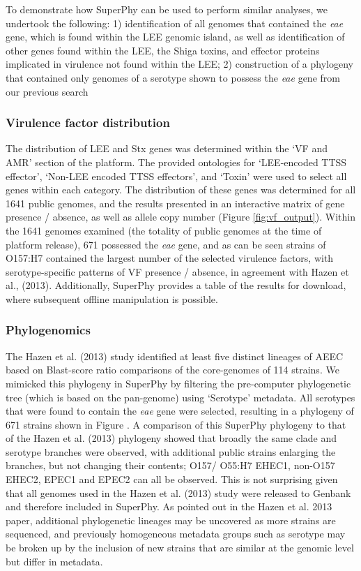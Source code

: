 \documentclass[doublespacing, linenumbers]{bmcart}
\begin{document}
To demonstrate how SuperPhy can be used to perform similar analyses, we undertook the following: 1) identification of all genomes that contained the \textit{eae} gene, which is found within the LEE genomic island, as well as identification of other genes found within the LEE,  the Shiga toxins, and effector proteins implicated in virulence not found within the LEE; 2) construction of a phylogeny that contained only genomes of a serotype shown to possess the \textit{eae} gene from our previous search

\subsubsection{Virulence factor distribution}
The distribution of LEE and Stx genes was determined within the `VF and AMR'  section of the platform. The provided ontologies for `LEE-encoded TTSS effector', `Non-LEE encoded TTSS effectors', and `Toxin' were used to select all genes within each category. The distribution of these genes was determined for all 1641 public genomes, and the results presented in an interactive matrix of gene presence / absence, as well as allele copy number (Figure \ref{fig:vf_output}). Within the 1641 genomes examined (the totality of public genomes at the time of platform release), 671 possessed the \textit{eae} gene, and as can be seen strains of O157:H7 contained the largest number of the selected virulence factors, with serotype-specific patterns of VF presence / absence, in agreement with Hazen et al., (2013). Additionally, SuperPhy provides a table of the results for download, where subsequent offline manipulation is possible.

\subsubsection{Phylogenomics}
 The Hazen et al. (2013) study identified at least five distinct lineages of AEEC based on Blast-score ratio comparisons of the core-genomes of 114 strains. We mimicked this phylogeny in SuperPhy by filtering the pre-computer phylogenetic tree (which is based on the pan-genome) using `Serotype' metadata. All serotypes that were found to contain the \textit{eae} gene were selected, resulting in a phylogeny of 671 strains shown in Figure . A comparison of this SuperPhy phylogeny to that of the Hazen et al. (2013) phylogeny showed that broadly the same clade and serotype branches were observed, with additional public strains enlarging the branches, but not changing their contents; O157/ O55:H7 EHEC1, non-O157 EHEC2, EPEC1 and EPEC2 can all be observed. This is not surprising given that all genomes used in the Hazen et al. (2013) study were released to Genbank and therefore included in SuperPhy. As pointed out in the Hazen et al. 2013 paper, additional phylogenetic lineages may be uncovered as more strains are sequenced, and previously homogeneous metadata groups such as serotype may be broken up by the inclusion of new strains that are similar at the genomic level but differ in metadata.
\end{document}
